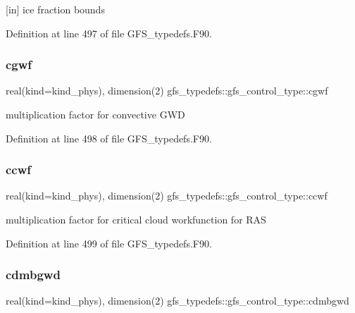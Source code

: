 [in] ice fraction bounds 



Definition at line 497 of file G\+F\+S\+\_\+typedefs.\+F90.

\mbox{\label{structgfs__typedefs_1_1gfs__control__type_a445a9eb644d8ddcf33574ead2989921a}} 
\subsubsection{cgwf}
{\footnotesize\ttfamily real(kind=kind\+\_\+phys), dimension(2) gfs\+\_\+typedefs\+::gfs\+\_\+control\+\_\+type\+::cgwf}



multiplication factor for convective G\+WD 



Definition at line 498 of file G\+F\+S\+\_\+typedefs.\+F90.

\mbox{\label{structgfs__typedefs_1_1gfs__control__type_a3cccce28f5d03d4b4176a9dab88d4590}} 
\subsubsection{ccwf}
{\footnotesize\ttfamily real(kind=kind\+\_\+phys), dimension(2) gfs\+\_\+typedefs\+::gfs\+\_\+control\+\_\+type\+::ccwf}



multiplication factor for critical cloud workfunction for R\+AS 



Definition at line 499 of file G\+F\+S\+\_\+typedefs.\+F90.

\mbox{\label{structgfs__typedefs_1_1gfs__control__type_aaa6752102028d3249fcf442a7ba9d92a}} 
\subsubsection{cdmbgwd}
{\footnotesize\ttfamily real(kind=kind\+\_\+phys), dimension(2) gfs\+\_\+typedefs\+::gfs\+\_\+control\+\_\+type\+::cdmbgwd}




